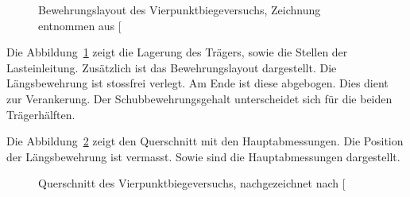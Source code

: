 \documentclass[
  11pt,
  letterpaper,
]{scrreprt}
\begin{document}
\begin{figure}[H]


\caption{\label{fig-versuchsskizze-SV14}Bewehrungslayout des
Vierpunktbiegeversuchs, Zeichnung entnommen aus
{[}\citeproc{ref-gitz_ansatze_2024}{1}{]}}

\end{figure}%

Die Abbildung~\ref{fig-versuchsskizze-SV14} zeigt die Lagerung des
Trägers, sowie die Stellen der Lasteinleitung. Zusätzlich ist das
Bewehrungslayout dargestellt. Die Längsbewehrung ist stossfrei verlegt.
Am Ende ist diese abgebogen. Dies dient zur Verankerung. Der
Schubbewehrungsgehalt unterscheidet sich für die beiden Trägerhälften.

Die Abbildung~\ref{fig-QS-SV14} zeigt den Querschnitt mit den
Hauptabmessungen. Die Position der Längsbewehrung ist vermasst. Sowie
sind die Hauptabmessungen dargestellt.

\begin{figure}[H]


\caption{\label{fig-QS-SV14}Querschnitt des Vierpunktbiegeversuchs,
nachgezeichnet nach {[}\citeproc{ref-gitz_ansatze_2024}{1}{]}}

\end{figure}%
\end{document}
